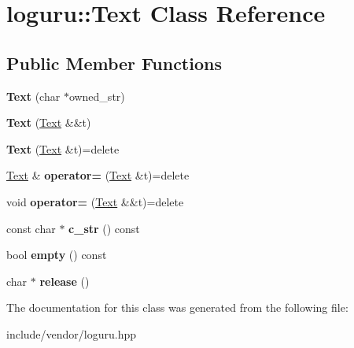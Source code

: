 \hypertarget{classloguru_1_1_text}{}\section{loguru\+:\+:Text Class Reference}
\label{classloguru_1_1_text}
\subsection*{Public Member Functions}
\begin{DoxyCompactItemize}
\item 
\mbox{\label{classloguru_1_1_text_afffaf8a50cc4ca0d930b85ae4761ef61}} 
{\bfseries Text} (char $\ast$owned\+\_\+str)
\item 
\mbox{\label{classloguru_1_1_text_a2b1e4ea540b597a356dfa4a507bc53d9}} 
{\bfseries Text} (\mbox{\hyperlink{classloguru_1_1_text}{Text}} \&\&t)
\item 
\mbox{\label{classloguru_1_1_text_aa1063d113ce007a3643795bad626e04b}} 
{\bfseries Text} (\mbox{\hyperlink{classloguru_1_1_text}{Text}} \&t)=delete
\item 
\mbox{\label{classloguru_1_1_text_a155370e239313634420310a708b1d62e}} 
\mbox{\hyperlink{classloguru_1_1_text}{Text}} \& {\bfseries operator=} (\mbox{\hyperlink{classloguru_1_1_text}{Text}} \&t)=delete
\item 
\mbox{\label{classloguru_1_1_text_a2565d0d69db1751a8e956cb4d53a13d7}} 
void {\bfseries operator=} (\mbox{\hyperlink{classloguru_1_1_text}{Text}} \&\&t)=delete
\item 
\mbox{\label{classloguru_1_1_text_a90acf675c1c2b178d455799c63e05443}} 
const char $\ast$ {\bfseries c\+\_\+str} () const
\item 
\mbox{\label{classloguru_1_1_text_acac2de193f211202ae4c18d1e845f0e2}} 
bool {\bfseries empty} () const
\item 
\mbox{\label{classloguru_1_1_text_a12033e376719ce1ddbccf51ff390bc90}} 
char $\ast$ {\bfseries release} ()
\end{DoxyCompactItemize}


The documentation for this class was generated from the following file\+:\begin{DoxyCompactItemize}
\item 
include/vendor/loguru.\+hpp\end{DoxyCompactItemize}

